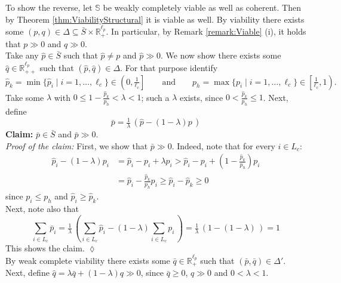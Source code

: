 \documentclass[11pt,fleqn]{article}
\begin{document}
\medskip\noindent
To show the reverse, let $\mathbb S$ be weakly completely viable as well as coherent. Then by Theorem \ref{thm:ViabilityStructural} it is viable as well.  By viability there exists some $( p , q ) \in \Delta \subseteq \bar S \times \mathbb R^{\ell_p}_+$. In particular, by Remark \ref{remark:Viable} (i), it holds that $p \gg 0$ and $q \gg 0$. \\
	Take any $\hat p \in \bar S$ such that $\hat p \neq p$ and $\hat p \gg 0$. We now show there exists some $\hat q \in \mathbb R^{\ell_p}_{++}$ such that $(\hat p, \hat q) \in \Delta$. For that purpose identify
	\[
	\hat p_k = \min \{ \hat p_i \mid i=1, \ldots , \ell_c \} \in \left( 0, \tfrac{1}{\ell_c} \right] \qquad \mbox{and} \qquad p_h = \max \{ p_i \mid i=1, \ldots , \ell_c \} \in \left[ \tfrac{1}{\ell_c} ,1 \right) .
	\]
	Take some $\lambda$ with $0 \leqslant 1- \tfrac{\hat p_k}{p_h} < \lambda <1$; such a $\lambda$ exists, since $0 < \tfrac{\hat p_k}{p_h} \leqslant 1$. Next, define
	\begin{equation}
	\bar p = \tfrac{1}{\lambda} \, \left( \hat p - (1- \lambda) p \, \right)
	\end{equation} 
	\textbf{Claim:} $\bar p \in \bar S$ and $\bar p \gg 0$. \\[1ex]
	\emph{Proof of the claim:} First, we show that $\bar p \gg 0$. Indeed, note that for every $i \in L_c \colon$
	\begin{align*}
	\hat p_i - (1- \lambda ) p_i &= \hat p_i - p_i + \lambda p_i > \hat p_i - p_i + \left( 1 - \tfrac{\hat p_k}{p_h} \right) p_i \\[1ex]
	& = \hat p_i - \tfrac{\hat p_k}{p_h} p_i \geqslant \hat p_i - \hat p_k \geqslant 0
	\end{align*}
	since $p_i \leqslant p_h$ and $\hat p_i \geqslant \hat p_k$. \\
	Next, note also that
	\[
	\sum_{i \in L_c} \bar p_i = \tfrac{1}{\lambda} \, \left( \sum_{i \in L_c} \hat p_i - (1- \lambda) \sum_{i \in L_c} p_i \, \right) = \tfrac{1}{\lambda} \, \left( 1 - (1- \lambda) \, \right) =1
	\]
	This shows the claim. \hfill $\lozenge$ \\[1ex]
	By weak complete viability there exists some $\bar q \in \mathbb R^{\ell_p}_+$ such that $( \bar p , \bar q ) \in \Delta'$. \\
	Next, define $\hat q = \lambda \bar q + (1- \lambda ) q \gg 0$, since $\bar q \geqslant 0$, $q \gg 0$ and $0 < \lambda < 1$. \\
\end{document}
